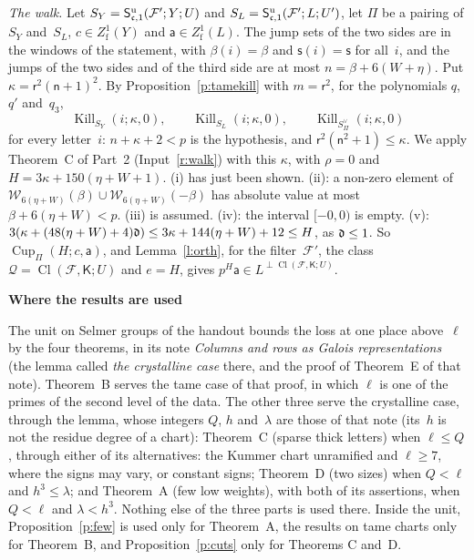 \documentclass[11pt,a4paper]{article}
\makeatletter
\newcommand{\m}[1]{\mbox{$#1$}}        %
\newcommand{\sect}[2]{\refstepcounter{section}\label{#2}\par\addvspace{19pt plus 4pt minus 2pt}\Needspace{7\baselineskip}%
  \noindent\llap{{\fontsize{13.2}{16}\selectfont\bfseries\color{inkfaint}\thesection}\hspace{9pt}}%
  {\fontsize{13.2}{16}\selectfont\bfseries\color{ink}#1}\par\nopagebreak\vspace{-1pt}}
\theoremstyle{plainx}
\theoremstyle{uprightx}
\renewenvironment{proof}[1][Proof]{\par\pushQED{\qed}\normalfont\topsep0pt\partopsep0pt
  \trivlist\item[\hskip\labelsep\itshape #1.]\ignorespaces}{\popQED\endtrivlist\@endpefalse}
\providecommand{\twoWin}[2]{\mathcal{W}_{#1}(#2)}
\providecommand{\Kills}[4]{\operatorname{Kill}_{#1}(#2;#3,#4)}
\providecommand{\third}[1]{S^{\vee}_{#1}}
\providecommand{\CupB}[4]{\operatorname{Cup}_{#1}(#2;#3,#4)}
\providecommand{\InCl}[3]{\operatorname{Cl}(#1,#2;#3)}
\providecommand{\cupOrth}[2]{{#2}^{\perp#1}}
\makeatother
\begin{document}
\begin{proof}[Proof of Theorem B]
\emph{The walk.} Let $S_Y=\mathsf{S}^{\mathrm{u}}_{\mathfrak{c},1}(\mathcal{F}';Y;U)$ and $S_L=\mathsf{S}^{\mathrm{u}}_{\mathfrak{c},1}(\mathcal{F}';L;U')$, let $\Pi$ be a pairing of
$S_Y$ and~$S_L$, $c\in Z^{1}_{\mathrm{f}}(Y)$ and $\mathsf{a}\in Z^{1}_{\mathrm{f}}(L)$. The jump sets of the two
sides are in the windows of the statement, with \m{\beta(i)=\beta} and $\mathsf{s}(i)=\mathsf{s}$ for all~$i$,
and the jumps of the two sides and of the third side are at most \m{n=\beta+6(W+\eta)}. Put
$\kappa=\mathsf{r}^{2}(\mathsf{n}+1)^{2}$. By Proposition~\ref{p:tamekill} with \m{m=\mathsf{r}^{2}}, for the
polynomials $q$, $q'$ and~$q_3$,
\[\Kills{S_Y}{i}{\kappa}{0},\qquad\Kills{S_L}{i}{\kappa}{0},\qquad\Kills{\third{\Pi}}{i}{\kappa}{0}\]
for every letter~$i$: \m{n+\kappa+2<p} is the hypothesis, and
$\mathsf{r}^{2}(\mathsf{n}^{2}+1)\le\kappa$. We apply Theorem~C of Part~2 (Input~\ref{r:walk}) with this
$\kappa$, with \m{\rho=0} and $H=3\kappa+150(\eta+W+1)$. (i) has just been shown. (ii): a non-zero element
of $\twoWin{6(\eta+W)}{\beta}\cup\twoWin{6(\eta+W)}{-\beta}$ has absolute value at most
\m{\beta+6(\eta+W)<p}. (iii) is assumed. (iv): the interval \m{[-0,0)} is empty. (v):
$3(\kappa+(48(\eta+W)+4)\mathfrak{d})\le3\kappa+144(\eta+W)+12\le H$, as \m{\fd\le1}. So
$\CupB{\Pi}{H}{c}{\mathsf{a}}$, and Lemma~\ref{l:orth}, for the filter~$\mathcal{F}'$, the class
$\mathcal{Q}=\InCl{\mathcal{F}}{\mathsf{K}}{U}$ and \m{e=H}, gives
$p^{H}\mathsf{a}\in\cupOrth{\InCl{\mathcal{F}}{\mathsf{K}}{U}}{L}$.
\end{proof}

\sect{Where the results are used}{s:used}
The unit on Selmer groups of the handout bounds the loss at one place above~$\ell$ by the four theorems, in
its note \emph{Columns and rows as Galois representations} (the lemma called \emph{the crystalline case} there,
and the proof of Theorem~E of that note). Theorem~B serves the tame case of that proof, in which $\ell$ is one of
the primes of the second level of the data. The other three serve the crystalline case, through the lemma, whose
integers $Q$, $h$ and~$\lambda$ are those of that note (its~$h$ is not the residue degree of a chart):
Theorem~C (sparse thick letters) when \m{\ell\le Q}, through either of its alternatives: the Kummer chart
unramified and \m{\ell\ge7}, where the signs may vary, or constant signs; Theorem~D (two sizes) when
\m{Q<\ell} and \m{h^{3}\le\lambda}; and Theorem~A (few low weights), with both of its assertions, when
\m{Q<\ell} and \m{\lambda<h^{3}}. Nothing else of the three parts is used there. Inside the unit,
Proposition~\ref{p:few} is used only for Theorem~A, the results on tame charts only for Theorem~B, and
Proposition~\ref{p:cuts} only for Theorems C and~D.
\end{document}
